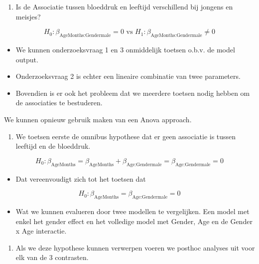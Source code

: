 \documentclass[
  dutch,
  letterpaper,
  12pt]{book}
\providecommand{\tightlist}{%
  \setlength{\itemsep}{0pt}\setlength{\parskip}{0pt}}
\theoremstyle{definition}
\theoremstyle{definition}
\theoremstyle{definition}
\theoremstyle{remark}
\begin{document}
\begin{enumerate}
\def\labelenumi{\arabic{enumi}.}
\setcounter{enumi}{2}
\tightlist
\item
  Is de Associatie tussen bloeddruk en leeftijd verschillend bij jongens
  en meisjes?
\end{enumerate}

\[H_0: \beta_\text{AgeMonths:Gendermale} = 0 \text{ vs } H_1: \beta_\text{AgeMonths:Gendermale} \neq 0
\]

\begin{itemize}
\tightlist
\item
  We kunnen onderzoeksvraag 1 en 3 onmiddelijk toetsen o.b.v. de model
  output.
\item
  Onderzoeksvraag 2 is echter een lineaire combinatie van twee
  parameters.
\item
  Bovendien is er ook het probleem dat we meerdere toetsen nodig hebben
  om de associaties te bestuderen.
\end{itemize}

We kunnen opnieuw gebruik maken van een Anova approach.

\begin{enumerate}
\def\labelenumi{\arabic{enumi}.}
\tightlist
\item
  We toetsen eerste de omnibus hypothese dat er geen associatie is
  tussen leeftijd en de bloeddruk.
\end{enumerate}

\[
H_0: \beta_\text{AgeMonths} = \beta_\text{AgeMonths} + \beta_\text{Age:Gendermale} = \beta_\text{Age:Gendermale} = 0
\]

\begin{itemize}
\tightlist
\item
  Dat vereenvoudigt zich tot het toetsen dat
\end{itemize}

\[
H_0: \beta_\text{AgeMonths} = \beta_\text{Age:Gendermale} = 0
\]

\begin{itemize}
\tightlist
\item
  Wat we kunnen evalueren door twee modellen te vergelijken. Een model
  met enkel het gender effect en het volledige model met Gender, Age en
  de Gender x Age interactie.
\end{itemize}

\begin{enumerate}
\def\labelenumi{\arabic{enumi}.}
\setcounter{enumi}{1}
\tightlist
\item
  Als we deze hypothese kunnen verwerpen voeren we posthoc analyses uit
  voor elk van de 3 contrasten.
\end{enumerate}
\end{document}
